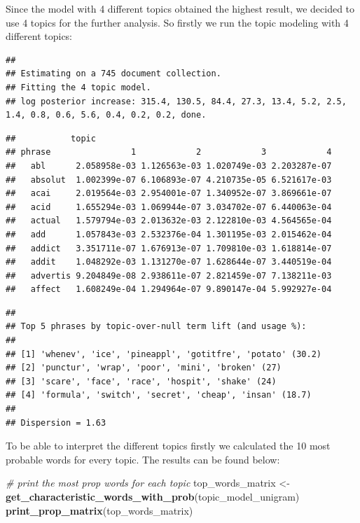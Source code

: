 \documentclass[
]{article}
\newenvironment{Shaded}{\begin{snugshade}}{\end{snugshade}}
\newcommand{\CommentTok}[1]{\textcolor[rgb]{0.56,0.35,0.01}{\textit{#1}}}
\newcommand{\FunctionTok}[1]{\textcolor[rgb]{0.13,0.29,0.53}{\textbf{#1}}}
\newcommand{\NormalTok}[1]{#1}
\newcommand{\OtherTok}[1]{\textcolor[rgb]{0.56,0.35,0.01}{#1}}
\begin{document}
Since the model with 4 different topics obtained the highest result, we
decided to use 4 topics for the further analysis. So firstly we run the
topic modeling with 4 different topics:

\tiny

\begin{verbatim}
## 
## Estimating on a 745 document collection.
## Fitting the 4 topic model.
## log posterior increase: 315.4, 130.5, 84.4, 27.3, 13.4, 5.2, 2.5, 1.4, 0.8, 0.6, 5.6, 0.4, 0.2, 0.2, done.
\end{verbatim}

\begin{verbatim}
##           topic
## phrase                1            2            3            4
##   abl      2.058958e-03 1.126563e-03 1.020749e-03 2.203287e-07
##   absolut  1.002399e-07 6.106893e-07 4.210735e-05 6.521617e-03
##   acai     2.019564e-03 2.954001e-07 1.340952e-07 3.869661e-07
##   acid     1.655294e-03 1.069944e-07 3.034702e-07 6.440063e-04
##   actual   1.579794e-03 2.013632e-03 2.122810e-03 4.564565e-04
##   add      1.057843e-03 2.532376e-04 1.301195e-03 2.015462e-04
##   addict   3.351711e-07 1.676913e-07 1.709810e-03 1.618814e-07
##   addit    1.048292e-03 1.131270e-07 1.628644e-07 3.440519e-04
##   advertis 9.204849e-08 2.938611e-07 2.821459e-07 7.138211e-03
##   affect   1.608249e-04 1.294964e-07 9.890147e-04 5.992927e-04
\end{verbatim}

\begin{verbatim}
## 
## Top 5 phrases by topic-over-null term lift (and usage %):
## 
## [1] 'whenev', 'ice', 'pineappl', 'gotitfre', 'potato' (30.2) 
## [2] 'punctur', 'wrap', 'poor', 'mini', 'broken' (27) 
## [3] 'scare', 'face', 'race', 'hospit', 'shake' (24) 
## [4] 'formula', 'switch', 'secret', 'cheap', 'insan' (18.7) 
## 
## Dispersion = 1.63
\end{verbatim}

\normalsize

To be able to interpret the different topics firstly we calculated the
10 most probable words for every topic. The results can be found below:

\tiny

\begin{Shaded}
\begin{Highlighting}[]
\CommentTok{\# print the most prop words for each topic}
\NormalTok{top\_words\_matrix }\OtherTok{\textless{}{-}} \FunctionTok{get\_characteristic\_words\_with\_prob}\NormalTok{(topic\_model\_unigram)}
\FunctionTok{print\_prop\_matrix}\NormalTok{(top\_words\_matrix)}
\end{Highlighting}
\end{Shaded}
\end{document}
